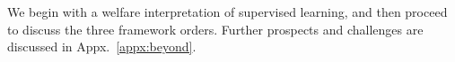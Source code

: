 We begin with a welfare interpretation of supervised learning,
and then proceed to discuss the three framework orders.
Further prospects and challenges are discussed in Appx.~\ref{appx:beyond}.
\squeeze







